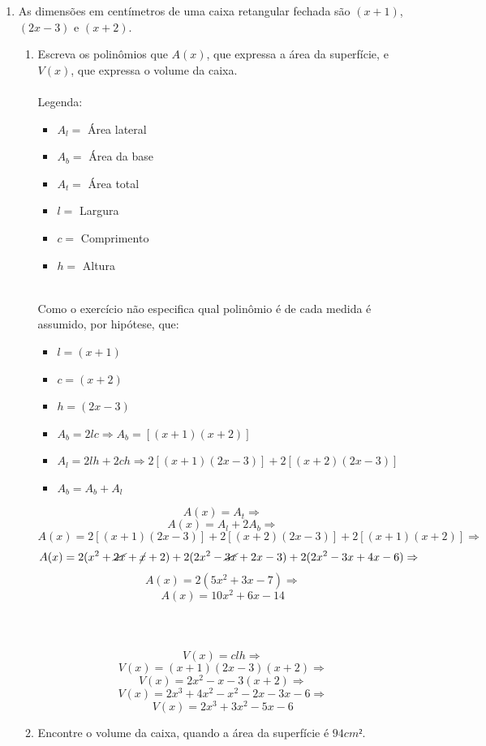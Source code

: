 \documentclass[a4paper, 12pt]{article}
\begin{document}
\begin{enumerate}
\item As dimensões em centímetros de uma caixa retangular fechada são $(x+1)$, $(2x-3)$ e $(x+2)$.
  \begin{enumerate}
  \item Escreva os polinômios que $A(x)$, que expressa a área da superfície, e $V(x)$, que expressa o volume da caixa. \\\\
    Legenda: \\
    \begin{itemize}
    \item $A_l = $ Área lateral
    \item $A_b = $ Área da base
    \item $A_t = $ Área total
    \item $l = $ Largura
    \item $c = $ Comprimento
    \item $h = $ Altura
    \end{itemize} \\
    Como o exercício não especifica qual polinômio é de cada medida é assumido, por hipótese, que:\\
    \begin{itemize}
    \item $l = (x+1) $
    \item $c = (x+2) $
    \item $h = (2x-3) $
    \item $A_b = 2lc \Rightarrow A_b = [(x+1)(x+2)] $
    \item $A_l = 2lh + 2ch \Rightarrow  2[(x+1)(2x-3)] + 2[(x+2)(2x-3)] $
    \item $A_b =  A_b + A_l $    
    \end{itemize}
    $$ A(x) = A_t \Rightarrow $$
    $$ A(x) = A_l + 2A_b \Rightarrow $$
    $$ A(x) =  2[(x+1)(2x-3)] + 2[(x+2)(2x-3)] + 2 [(x+1)(x+2)] \Rightarrow $$
    $$ A(x) = 2(x^2+\cancel{2x}+\cancel{x}+2) + 2(2x^2-\cancel{3x}+2x-3) + 2(2x^2-3x+4x-6) \Rightarrow $$
    $$ A(x) = 2(5x^2+3x-7) \Rightarrow $$
    $$ \boxed{A(x) = 10x^2+6x-14} $$ \\ \\ \\
    $$ V(x) = clh \Rightarrow $$
    $$ V(x) = (x+1)(2x-3)(x+2) \Rightarrow $$
    $$ V(x) = 2x^2-x-3(x+2) \Rightarrow $$
    $$ V(x) = 2x^3+4x^2-x^2-2x-3x-6 \Rightarrow $$
    $$ \boxed{ V(x) = 2x^3+3x^2-5x-6} $$
  \item  Encontre o volume da caixa, quando a área da superfície é $94 cm²$.

\end{enumerate}
\end{enumerate}
\end{document}
